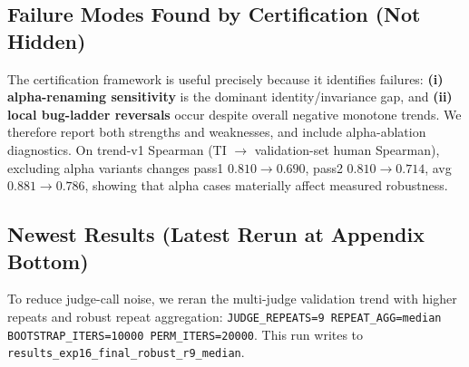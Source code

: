 \documentclass{article}
\begin{document}
\begin{table}[t]
  \centering
  \small
  \caption{\textbf{Leanstral remains low-alignment under multiple index constructions.}
    Re-aggregation improves over the arithmetic baseline in some splits, but all three settings remain near-zero or negative.
    This suggests the bottleneck is likely the underlying judge behavior for this ranking task (human-preference alignment), not only index form.
    One plausible hypothesis is that Leanstral is stronger for Lean proof editing/generation than for calibrated pairwise judging under this rubric; we treat this as a testable conjecture, not a final causal claim.}
  \label{tab:app-leanstral-index-reagg}
\end{table}

\subsection{Failure Modes Found by Certification (Not Hidden)}
The certification framework is useful precisely because it identifies failures:
\textbf{(i) alpha-renaming sensitivity} is the dominant identity/invariance gap,
and \textbf{(ii) local bug-ladder reversals} occur despite overall negative monotone trends.
We therefore report both strengths and weaknesses, and include alpha-ablation diagnostics.
On trend-v1 Spearman (TI \(\rightarrow\) validation-set human Spearman), excluding alpha variants changes
pass1 \(0.810\rightarrow0.690\), pass2 \(0.810\rightarrow0.714\), avg \(0.881\rightarrow0.786\),
showing that alpha cases materially affect measured robustness.

\subsection{Newest Results (Latest Rerun at Appendix Bottom)}
To reduce judge-call noise, we reran the multi-judge validation trend with higher repeats and robust repeat aggregation:
\texttt{JUDGE\_REPEATS=9 REPEAT\_AGG=median BOOTSTRAP\_ITERS=10000 PERM\_ITERS=20000}.
This run writes to \texttt{results\_exp16\_final\_robust\_r9\_median}.
\end{document}
